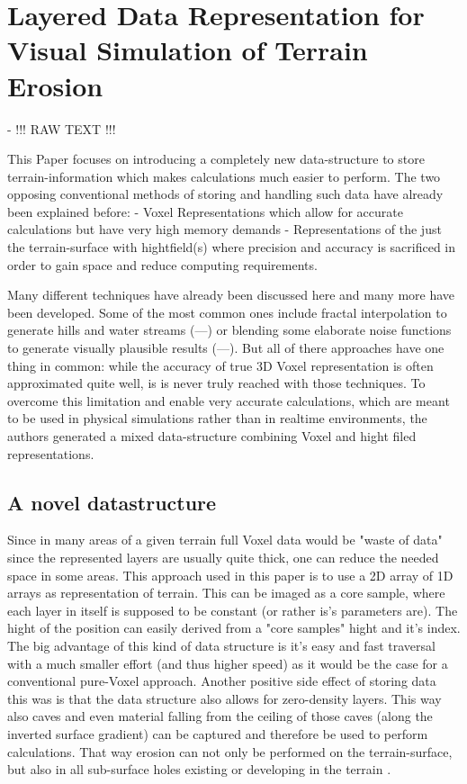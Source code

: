 \section{Layered Data Representation for Visual Simulation of Terrain Erosion}

\cite{marechal2010heat} - !!! RAW TEXT !!!

This Paper focuses on introducing a completely new data-structure to store terrain-information which makes calculations much easier to perform. The two opposing conventional methods of storing and handling such data have already been explained before:
- Voxel Representations which allow for accurate calculations but have very high memory demands
- Representations of the just the terrain-surface with hightfield(s) where precision and accuracy is sacrificed in order to gain space and reduce computing requirements.

Many different techniques have already been discussed here and many more have been developed. Some of the most common ones include fractal interpolation to generate hills and water streams (---) or blending some elaborate noise functions to generate visually plausible results (---). But all of there approaches have one thing in common: while the accuracy of true 3D Voxel representation is often approximated quite well, is is never truly reached with those techniques.
To overcome this limitation and enable very accurate calculations, which are meant to be used in physical simulations rather than in realtime environments, the authors generated a mixed data-structure combining Voxel and hight filed representations.

\subsection{A novel datastructure}
Since in many areas of a given terrain full Voxel data would be "waste  of data" \cite{marechal2010heat} since the represented layers are usually quite thick, one can reduce the needed space in some areas. This approach used in this paper is to use a 2D array of 1D arrays as representation of terrain. This can be  imaged as a core sample, where each layer in itself is supposed to be constant (or rather is's parameters are). The hight of the position can easily derived from a "core samples" hight and it's index.
The big advantage of this kind of data structure is it’s easy and fast traversal with a much smaller effort (and thus higher speed) as it would be the case for a conventional pure-Voxel approach. Another positive side effect of storing data this was is that the data structure also allows for zero-density layers. This way also caves and even material falling from the ceiling of those caves (along the inverted surface gradient) can be captured and therefore be used to perform calculations. That way erosion can not only be performed on the terrain-surface, but also in all sub-surface holes existing or developing in the terrain \cite{marechal2010heat}.

